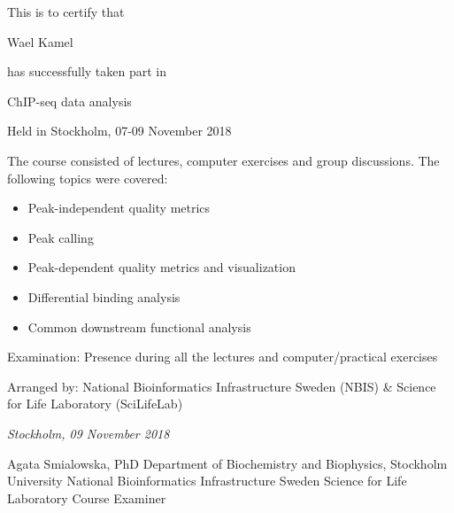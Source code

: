 \documentclass[12pt]{article}\usepackage[]{graphicx}\usepackage[]{color}
\newcommand{\courseName}{ChIP-seq data analysis}
\newcommand{\coursePoints}{1 hp}
\newcommand{\courseLocation}{Stockholm}
\newcommand{\courseDate}{07-09 November 2018}
\newcommand{\courseLastDay}{09 November 2018}
\newcommand{\courseExaminer}{Agata Smialowska, PhD}
\begin{document}
\large
This is to certify that 


\LARGE
\color{blue} 
Wael Kamel
\color{black} 

\large
has successfully taken part in \newline \newline

\color{blue} 
\LARGE
\begin{center}{\courseName}  \end{center} 
\color{black} 

\large
\begin{center} Held in {\courseLocation}, {\courseDate} \end{center} 

\vspace{8mm}
\normalsize
The course consisted of lectures, computer exercises and group discussions. The following topics were covered:
\begin{itemize}
  \item Peak-independent quality metrics
  \item Peak calling
  \item Peak-dependent quality metrics and visualization
  \item Differential binding analysis
  \item Common downstream functional analysis
\end{itemize}


\vspace{12mm}
Examination: \newline
Presence during all the lectures and computer/practical exercises

\vspace{12mm}
Arranged by: \newline
National Bioinformatics Infrastructure Sweden (NBIS) \& Science for Life Laboratory (SciLifeLab)


\vspace{5mm}
\textit{{\courseLocation}, {\courseLastDay}}
\vspace{15mm}


{\courseExaminer} \newline
\small
Department of Biochemistry and Biophysics, Stockholm University \newline
National Bioinformatics Infrastructure Sweden \newline
Science for Life Laboratory \newline
Course Examiner



\end{document}
